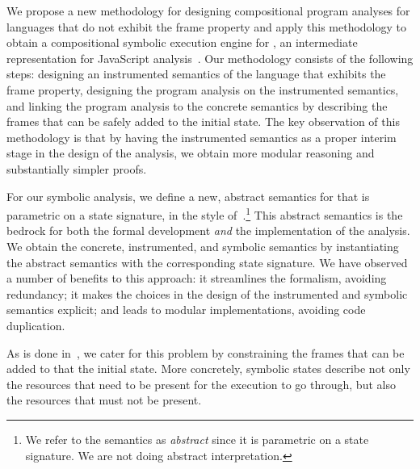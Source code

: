 
We propose a new methodology for designing compositional program analyses for languages that do not exhibit the frame property and apply this methodology to obtain a compositional symbolic execution engine for \jsil, an intermediate representation for JavaScript analysis~\cite{javert}. 
%
%
Our methodology consists of the following steps:  designing an instrumented semantics of the language that exhibits the frame property,  designing the program  analysis on the instrumented semantics, and  linking the program analysis to the concrete semantics by describing the frames that can be safely added to the initial state.   
%
The key observation of this methodology is that by having the instrumented semantics as a proper interim stage in the design of the analysis, we obtain 
more modular reasoning and substantially simpler proofs.

For our symbolic analysis, we define a new, abstract semantics for \jsil that is parametric on a \jsil state signature, in the style of~\citet{vanhorn:icfp:2010}.\footnote{We refer to the semantics as \emph{abstract} since it 
is parametric on a \jsil state signature. We are not doing abstract interpretation.} 
This abstract semantics is the bedrock for both the formal development \emph{and} the implementation of the analysis. 
We obtain the concrete, instrumented, and symbolic semantics by instantiating 
the abstract semantics with the corresponding state signature. 
We have observed a number of benefits to this approach: it streamlines the formalism, avoiding redundancy; it makes the choices in the design of the instrumented and symbolic semantics explicit; and leads to modular implementations, avoiding code duplication.
%
%

As is done in~\cite{gardner:popl:2012,javert}, we cater for this problem by constraining the frames that can be added to that the initial state. More concretely, symbolic states
describe not only the resources that need to be present for the execution to go through, but also the resources that must not be present.



